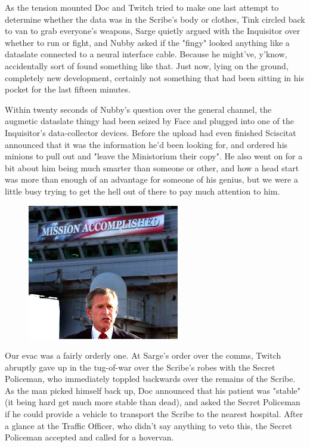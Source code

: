As the tension mounted Doc and Twitch tried to make one last attempt to determine whether the data was in the Scribe's body or clothes, Tink circled back to van to grab everyone's weapons, Sarge quietly argued with the Inquisitor over whether to run or fight, and Nubby asked if the "fingy" looked anything like a dataslate connected to a neural interface cable. 
Because he might've, y'know, accidentally sort of found something like that. 
Just now, lying on the ground, completely new development, certainly not something that had been sitting in his pocket for the last fifteen minutes.

Within twenty seconds of Nubby's question over the general channel, the augmetic dataslate thingy had been seized by Face and plugged into one of the Inquisitor's data-collector devices. 
Before the upload had even finished Sciscitat announced that it was the information he'd been looking for, and ordered his minions to pull out and "leave the Ministorium their copy". 
He also went on for a bit about him being much smarter than someone or other, and how a head start was more than enough of an advantage for someone of his genius, but we were a little busy trying to get the hell out of there to pay much attention to him.

\begin{figure}
	\begin{center}
		\includegraphics[width=\figwidth]{pics/17/54.png}
	\end{center}
\end{figure}
Our evac was a fairly orderly one. 
At Sarge's order over the comms, Twitch abruptly gave up in the tug-of-war over the Scribe's robes with the Secret Policeman, who immediately toppled backwards over the remains of the Scribe. 
As the man picked himself back up, Doc announced that his patient was "stable" (it being hard get much more stable than dead), and asked the Secret Policeman if he could provide a vehicle to transport the Scribe to the nearest hospital. 
After a glance at the Traffic Officer, who didn't say anything to veto this, the Secret Policeman accepted and called for a hovervan.

